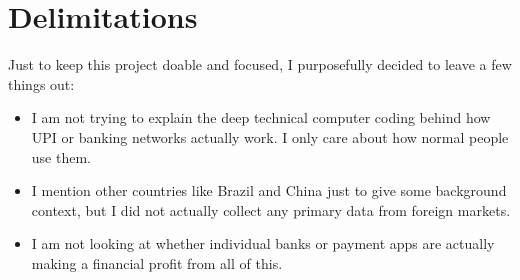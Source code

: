 \section{Delimitations}

Just to keep this project doable and focused, I purposefully decided to leave a few things out:

\begin{itemize}
    \item I am not trying to explain the deep technical computer coding behind how UPI or banking networks actually work. I only care about how normal people use them.
    \item I mention other countries like Brazil and China just to give some background context, but I did not actually collect any primary data from foreign markets.
    \item I am not looking at whether individual banks or payment apps are actually making a financial profit from all of this.
\end{itemize}